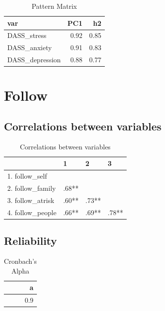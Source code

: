 \documentclass[]{article}
\begin{document}
\begin{table}[H]

\caption{\label{tab:unnamed-chunk-26}Pattern Matrix}
\centering
\fontsize{6}{8}\selectfont
\begin{tabular}[t]{lrr}
\toprule
var & PC1 & h2\\
\midrule
DASS\_stress & 0.92 & 0.85\\
DASS\_anxiety & 0.91 & 0.83\\
DASS\_depression & 0.88 & 0.77\\
\bottomrule
\end{tabular}
\end{table}

\newpage

\hypertarget{follow}{%
\section{Follow}\label{follow}}

\hypertarget{correlations-between-variables-5}{%
\subsection{Correlations between
variables}\label{correlations-between-variables-5}}

\begin{table}[H]

\caption{\label{tab:unnamed-chunk-27}Correlations between variables}
\centering
\fontsize{6}{8}\selectfont
\begin{tabular}[t]{llll}
\toprule
  & 1 & 2 & 3\\
\midrule
1. follow\_self &  &  & \\
2. follow\_family & .68** &  & \\
3. follow\_atrisk & .60** & .73** & \\
4. follow\_people & .66** & .69** & .78**\\
\bottomrule
\end{tabular}
\end{table}

\hypertarget{reliability-4}{%
\subsection{Reliability}\label{reliability-4}}

\begin{table}[H]

\caption{\label{tab:unnamed-chunk-28}Cronbach's Alpha}
\centering
\fontsize{6}{8}\selectfont
\begin{tabular}[t]{r}
\toprule
a\\
\midrule
0.9\\
\bottomrule
\end{tabular}
\end{table}
\end{document}
